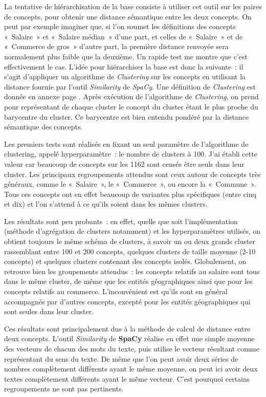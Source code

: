 La tentative de hiérarchisation de la base consiste à utiliser cet outil sur les paires de concepts, pour obtenir une distance sémantique entre les deux concepts. On peut par exemple imaginer que, si l'on soumet les définitions des concepts «~Salaire~» et «~Salaire médian~» d'une part, et celles de «~Salaire~» et de «~Commerce de gros~» d'autre part, la première distance renvoyée sera normalement plus faible que la deuxième. Un rapide test me montre que c'est effectivement le cas. L'idée pour hiérarchiser la base est donc la suivante~: il s'agit d'appliquer un algorithme de \textit{Clustering} sur les concepts en utilisant la distance fournie par l'outil \textit{Similarity} de \textit{SpaCy}. Une définition de \textit{Clustering} est donnée en annexe page \pageref{clustering}. Après exécution de l'algorithme de \textit{Clustering}, on prend pour représentant de chaque cluster le concept du cluster étant le plus proche du barycentre du cluster. Ce barycentre est bien entendu pondéré par la distance sémantique des concepts.
\newline

Les premiers tests sont réalisés en fixant un seul paramètre de l'algorithme de clustering, appelé hyperparamètre~: le nombre de clusters à 100. J'ai établi cette valeur car beaucoup de concepts sur les 1162 sont censés être seuls dans leur cluster. Les principaux regroupements attendus sont ceux autour de concepts très généraux, comme le «~Salaire~», le «~Commerce~», ou encore la «~Commune~». Tous ces concepts ont en effet beaucoup de variantes plus spécifiques (entre cinq et dix) et l'on s'attend à ce qu'ils soient dans les mêmes clusters.
\newline

Les résultats sont peu probants~: en effet, quelle que soit l'implémentation (méthode d'agrégation de clusters notamment) et les hyperparamètres utilisés, on obtient toujours le même schéma de clusters, à savoir un ou deux grands cluster rassemblant entre 100 et 200 concepts, quelques clusters de taille moyenne (2-10 concepts) et quelques clusters contenant des concepts isolés. Globalement, on retrouve bien les groupements attendus~: les concepts relatifs au salaire sont tous dans le même cluster, de même que les entités géographiques ainsi que pour les concepts relatifs au commerce. L'inconvénient est qu'ils sont en général accompagnés par d'autres concepts, excepté pour les entités géographiques qui sont seules dans leur cluster.
\newline

Ces résultats sont principalement dus à la méthode de calcul de distance entre deux concepts. L'outil \textit{Similarity} de \textbf{SpaCy} réalise en effet une simple moyenne des vecteurs de chacun des mots du texte, puis utilise le vecteur résultant comme représentant du sens du texte. De même que l'on peut avoir deux séries de nombres complètement différents ayant le même moyenne, on peut ici avoir deux textes complètement différents ayant le même vecteur. C'est pourquoi certains regroupements ne sont pas pertinents.


